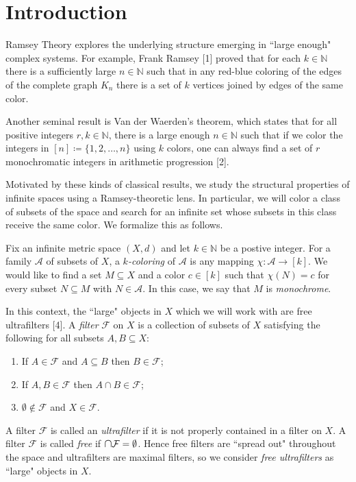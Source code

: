 \section{Introduction}
Ramsey Theory explores the underlying structure emerging in ``large enough" complex systems. For example, Frank Ramsey [1] proved that for each \( k \in \mathbb{N}  \) there is a sufficiently large \( n \in \mathbb{N}  \) such that in any red-blue coloring of the edges of the complete graph \( K_{n} \) there is a set of \( k \) vertices joined by edges of the same color.

Another seminal result is Van der Waerden's theorem, which states that for all positive integers \( r, k \in \mathbb{N}  \), there is a large enough \( n \in \mathbb{N}  \) such that if we color the integers in \( [n] \coloneqq \{ 1,2,\hdots ,n \}  \) using \( k \) colors, one can always find a set of \( r \) monochromatic integers in arithmetic progression [2].

Motivated by these kinds of classical results, we study the structural properties of infinite spaces using a Ramsey-theoretic lens. In particular, we will color a class of subsets of the space and search for an infinite set whose subsets in this class receive the same color. We formalize this as follows.

Fix an infinite metric space \( (X,d) \) and let \( k \in \mathbb{N}  \) be a postive integer. For a family \( \mathcal{A} \) of subsets of \( X \), a \emph{\( k \)-coloring} of \( \mathcal{A}  \) is any mapping \( \chi : \mathcal{A} \to [k] \). We would like to find a set \( M \subseteq X \) and a color \( c \in [k] \) such that \( \chi(N) = c \) for every subset \( N \subseteq M \) with \(N \in \mathcal{A}  \). In this case, we say that \( M \) is \emph{monochrome}.

In this context, the ``large" objects in \( X \) which we will work with are free ultrafilters [4]. A \emph{filter} \( \mathcal{F}  \) on \( X \) is a collection of subsets of \( X \) satisfying the following for all subsets \( A, B \subseteq X \):
\begin{enumerate}[leftmargin=1.2cm]
	
	\item If \( A \in \mathcal{F} \) and \( A \subseteq B \) then \( B \in \mathcal{F}  \);
	\item If \( A, B \in \mathcal{F}  \) then \( A \cap B \in \mathcal{F}  \);
	\item \( \emptyset  \notin \mathcal{F}  \) and \( X \in \mathcal{F}  \).
\end{enumerate}
A filter \( \mathcal{F}  \) is called an \emph{ultrafilter} if it is not properly contained in a filter on \( X \). A filter \( \mathcal{F}  \) is called \emph{free} if \( \medcap \mathcal{F} = \emptyset  \). Hence free filters are ``spread out" throughout the space and ultrafilters are maximal filters, so we consider \emph{free ultrafilters} as ``large" objects in \( X \).

